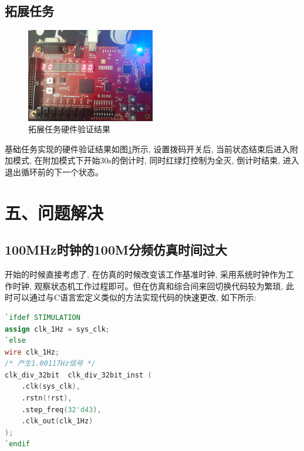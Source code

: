 \documentclass{article}
\newcommand{\fourhao}{\fontsize{14pt}{\baselineskip}\selectfont} %
\newcommand{\xiaosihao}{\fontsize{12pt}{\baselineskip}\selectfont} %
\begin{document}
\subsection*{拓展任务}
\begin{figure}[htbp]
    \centering
    \includegraphics[width=0.5\textwidth]{image/2024-06-20-09-45-50.png}
    \caption{拓展任务硬件验证结果}
    \label{image_addition_verify}
\end{figure}
基础任务实现的硬件验证结果如图\ref{image_addition_verify}所示, 设置拨码开关后, 当前状态结束后进入附加模式,
 在附加模式下开始30s的倒计时, 同时红绿灯控制为全灭, 倒计时结束, 进入退出循环前的下一个状态。\\
\section*{\fourhao 五、问题解决}
\xiaosihao
{}
\subsection*{100MHz时钟的100M分频仿真时间过大}
开始的时候直接考虑了, 在仿真的时候改变该工作基准时钟, 采用系统时钟作为工作时钟, 观察状态机工作过程即可。但在仿真和综合间来回切换代码较为繁琐, 此时可以通过与C语言宏定义类似的方法实现代码的快速更改, 如下所示:
\begin{lstlisting}[language=Verilog, caption={编译指令应用}]
`ifdef STIMULATION
assign clk_1Hz = sys_clk;
`else
wire clk_1Hz;
/* 产生1.00117Hz信号 */
clk_div_32bit  clk_div_32bit_inst (
    .clk(sys_clk),
    .rstn(!rst),
    .step_freq(32'd43),
    .clk_out(clk_1Hz)
);
`endif
\end{lstlisting}
\end{document}
